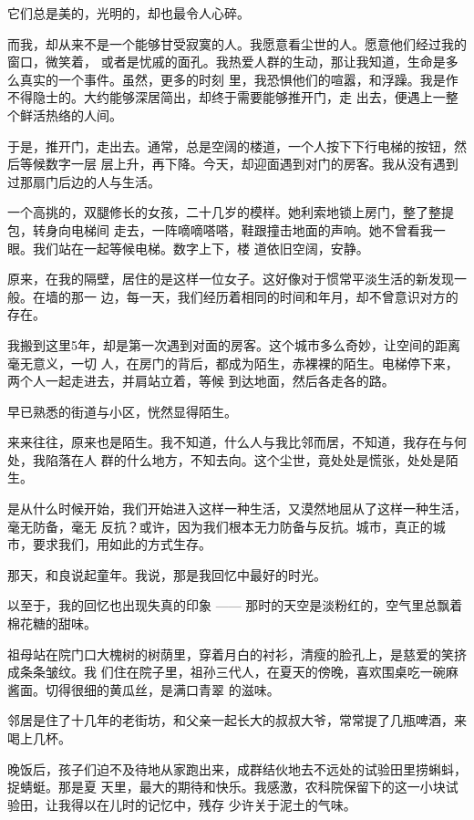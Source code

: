 		它们总是美的，光明的，却也最令人心碎。

		而我，却从来不是一个能够甘受寂寞的人。我愿意看尘世的人。愿意他们经过我的窗口，微笑着，
	或者是忧戚的面孔。我热爱人群的生动，那让我知道，生命是多么真实的一个事件。虽然，更多的时刻
	里，我恐惧他们的喧嚣，和浮躁。我是作不得隐士的。大约能够深居简出，却终于需要能够推开门，走
	出去，便遇上一整个鲜活热络的人间。

		于是，推开门，走出去。通常，总是空阔的楼道，一个人按下下行电梯的按钮，然后等候数字一层
	层上升，再下降。今天，却迎面遇到对门的房客。我从没有遇到过那扇门后边的人与生活。

		一个高挑的，双腿修长的女孩，二十几岁的模样。她利索地锁上房门，整了整提包，转身向电梯间
	走去，一阵嘀嘀嗒嗒，鞋跟撞击地面的声响。她不曾看我一眼。我们站在一起等候电梯。数字上下，楼
	道依旧空阔，安静。

		原来，在我的隔壁，居住的是这样一位女子。这好像对于惯常平淡生活的新发现一般。在墙的那一
	边，每一天，我们经历着相同的时间和年月，却不曾意识对方的存在。

		我搬到这里5年，却是第一次遇到对面的房客。这个城市多么奇妙，让空间的距离毫无意义，一切
	人，在房门的背后，都成为陌生，赤裸裸的陌生。电梯停下来，两个人一起走进去，并肩站立着，等候
	到达地面，然后各走各的路。

		早已熟悉的街道与小区，恍然显得陌生。

		来来往往，原来也是陌生。我不知道，什么人与我比邻而居，不知道，我存在与何处，我陷落在人
	群的什么地方，不知去向。这个尘世，竟处处是慌张，处处是陌生。

		是从什么时候开始，我们开始进入这样一种生活，又漠然地屈从了这样一种生活，毫无防备，毫无
	反抗？或许，因为我们根本无力防备与反抗。城市，真正的城市，要求我们，用如此的方式生存。

		那天，和良说起童年。我说，那是我回忆中最好的时光。

		以至于，我的回忆也出现失真的印象 —— 那时的天空是淡粉红的，空气里总飘着棉花糖的甜味。

		祖母站在院门口大槐树的树荫里，穿着月白的衬衫，清瘦的脸孔上，是慈爱的笑挤成条条皱纹。我
	们住在院子里，祖孙三代人，在夏天的傍晚，喜欢围桌吃一碗麻酱面。切得很细的黄瓜丝，是满口青翠
	的滋味。

		邻居是住了十几年的老街坊，和父亲一起长大的叔叔大爷，常常提了几瓶啤酒，来喝上几杯。

		晚饭后，孩子们迫不及待地从家跑出来，成群结伙地去不远处的试验田里捞蝌蚪，捉蜻蜓。那是夏
	天里，最大的期待和快乐。我感激，农科院保留下的这一小块试验田，让我得以在儿时的记忆中，残存
	少许关于泥土的气味。

